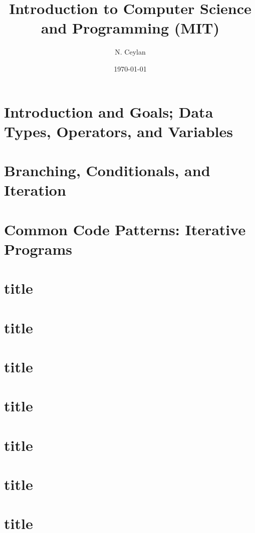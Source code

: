 \documentclass[letterpaper,12pt]{article}
\begin{document}
\title{Introduction to Computer Science and Programming (MIT) }
\author{N. Ceylan}
\date{\today}
\maketitle

\section{Introduction and Goals; Data Types, Operators, and Variables}


\section{Branching, Conditionals, and Iteration}


\section{Common Code Patterns: Iterative Programs}



\section{title}


\section{title}
\section{title}

\section{title}

\section{title}

\section{title}

\section{title}
\end{document}
